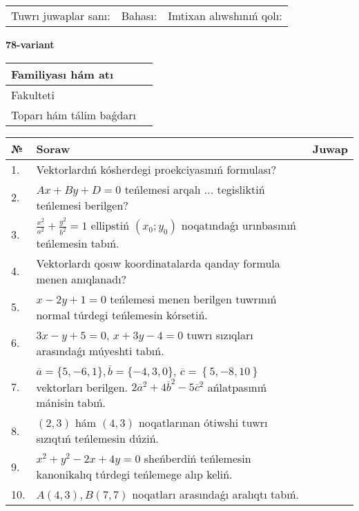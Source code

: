 \documentclass{article}
\begin{document}
\vspace{1cm}

\begin{tabular}{lll}
Tuwrı juwaplar sanı: \underline{\hspace{1.5cm}} & 
Bahası: \underline{\hspace{1.5cm}} & 
Imtixan alıwshınıń qolı: \underline{\hspace{2cm}} \\
\end{tabular}

\egroup

\newpage


\textbf{78-variant}\\

\bgroup
\def\arraystretch{1.6} %

\begin{tabular}{|m{5.7cm}|m{9.5cm}|}
\hline
Familiyası hám atı & \\
\hline
Fakulteti  & \\
\hline
Toparı hám tálim baǵdarı  & \\
\hline
\end{tabular}

\vspace{1cm}

\begin{tabular}{|m{0.7cm}|m{10cm}|m{4cm}|}
\hline
№ & Soraw & Juwap \\
\hline
1. & Vektorlardıń kósherdegi proekciyasınıń formulası? &  \\
\hline
2. & $Ax+By+D=0$ teńlemesi arqalı ... tegisliktiń teńlemesi berilgen? &  \\
\hline
3. & $\frac{x^2}{a^2}+\frac{y^2}{b^2}=1$ ellipstiń $(x_0;y_0)$ noqatındaǵı urınbasınıń teńlemesin tabıń. &  \\
\hline
4. & Vektorlardı qosıw koordinatalarda qanday formula menen anıqlanadı? &  \\
\hline
5. & $x-2y+1=0$ teńlemesi menen berilgen tuwrınıń normal túrdegi teńlemesin kórsetiń. &  \\
\hline
6. & $3x-y+5=0$, $x+3y-4=0$ tuwrı sızıqları arasındaǵı múyeshti tabıń. &  \\
\hline
7. & $\overline{a}=\{5,-6, 1 \}, \overline{b}=\{-4, 3, 0 \} $, $\overline{c}=\left\{ 5,-8, 10 \right\}$ vektorları berilgen. $2{\overline{a}}^{2}+4{\overline{b}}^{2}-5{\overline{c}}^{2}$ ańlatpasınıń mánisin tabıń. &  \\
\hline
8. & $(2, 3)$ hám $(4, 3)$ noqatlarınan ótiwshi tuwrı sızıqtıń teńlemesin dúziń. &  \\
\hline
9. & $x^{2}+y^{2}-2x+4y=0$ sheńberdiń teńlemesin kanonikalıq túrdegi teńlemege alıp keliń. &  \\
\hline
10. & $A(4, 3), B(7, 7)$ noqatları arasındaǵı aralıqtı tabıń. &  \\
\hline
\end{tabular}
\end{document}
